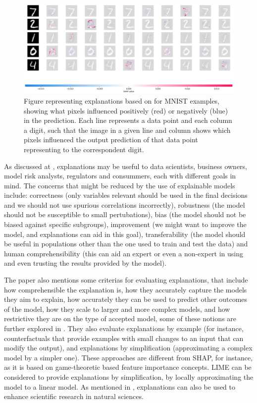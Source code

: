 \begin{figure}[ht]
\centering
\includegraphics[width=\textwidth]{gradSHAP}
\caption{Figure representing explanations based on  for MNIST examples, showing what pixels influenced positively (red) or negatively (blue) in the prediction. Each line represents a data point and  each column a digit, such that the image in a given line and column shows which pixels influenced the output prediction of that data point representing to the correspondent digit.}\label{fig:gradSHAP}
\end{figure}

As discussed at \cite{belle2021principles}, explanations may be useful to data scientists, business owners, model risk analysts, regulators and consummers, each with different goals in mind. The concerns that might be reduced by the use of explainable models include: correctness (only variables relevant should be used in the final decisions and we should not use spurious correlations incorrectly), robustness (the model should not be susceptible to small pertubations), bias (the model should not be biased against specific subgroups), improvement (we might want to improve the model, and explanations can aid in this goal), transferability (the model should be useful in populations other than the one used to train and test the data) and human comprehensibility (this can aid an expert or even a non-expert in using and even trusting the results provided by the model).

The paper also mentions some criterias for evaluating explanations, that include how comprehensible the explanation is, how they accurately capture the models they aim to explain, how accurately they can be used to predict other outcomes of the model, how they scale to larger and more complex models, and how restrictive they are on the type of accepted model, some of these notions are further explored in \cite{carvalho2019machine}. They also evaluate explanations by example (for instance, counterfactuals \cite{verma2020counterfactual} that provide examples with small changes to an input that can modify the output), and explanations by simplification (approximating a complex model by a simpler one). These approaches are different from SHAP, for instance, as it is based on game-theoretic based feature importance concepts. LIME can be considered to provide explanations by simplification, by locally approximating the model to a linear model. As mentioned in \cite{roscher2020explainable}, explanations can also be used to enhance scientific research in natural sciences.

